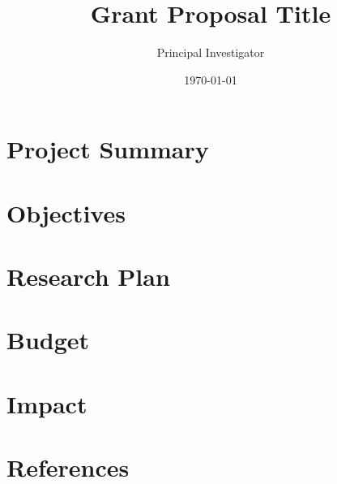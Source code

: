 \documentclass[12pt]{article}
\begin{document}
\title{Grant Proposal Title}
\author{Principal Investigator}
\date{\today}
\maketitle

\section{Project Summary}

\section{Objectives}

\section{Research Plan}

\section{Budget}

\section{Impact}

\section{References}
\end{document}
